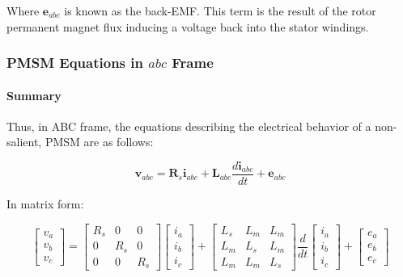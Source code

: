 \documentclass{article}
\begin{document}
Where $\mathbf{e}_{abc}$ is known as the back-EMF. This term is the result of the rotor permanent magnet flux inducing a voltage back into the stator windings.


\subsubsection{PMSM Equations in \texorpdfstring{$abc$}{abc} Frame}
\paragraph{Summary}


Thus, in ABC frame, the equations describing the electrical behavior of a non-salient, PMSM are as follows: 

\begin{equation}
    \mathbf{v}_{abc} = \mathbf{R}_s\mathbf{i}_{abc} + \mathbf{L}_{abc}\frac{d\mathbf{i}_{abc}}{dt} + \boldsymbol{e}_{abc}
\end{equation}

In matrix form:

\begin{equation}
\begin{bmatrix}
v_a \\
v_b \\
v_c
\end{bmatrix}
=
\begin{bmatrix}
R_s & 0 & 0 \\
0 & R_s & 0 \\
0 & 0 & R_s
\end{bmatrix}
\begin{bmatrix}
i_a \\
i_b \\
i_c
\end{bmatrix}
+
\begin{bmatrix}
L_s & L_m & L_m \\
L_m & L_s & L_m \\
L_m & L_m & L_s
\end{bmatrix}
\frac{d}{dt}
\begin{bmatrix}
i_a \\
i_b \\
i_c
\end{bmatrix}
+
\begin{bmatrix}
e_a \\
e_b \\
e_c
\end{bmatrix}
\end{equation}
\end{document}
